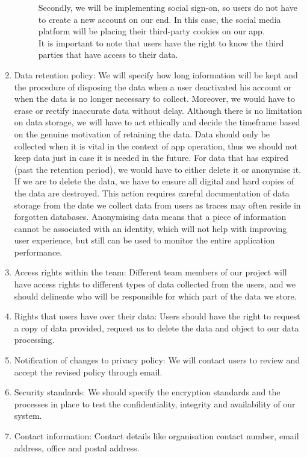 \begin{enumerate}
\begin{description}
        Secondly, we will be implementing social sign-on, so users do not have to create a new account on our end. In this case, the social media 
        platform will be placing their third-party cookies on our app.
        \\It is important to note that users have the right to know the third parties that have access to their data.
    \end{description}
    \item Data retention policy: We will specify how long information will be kept and the procedure of disposing the data when a user deactivated
    his account or when the data is no longer necessary to collect. Moreover, we would have to erase or rectify inaccurate data without delay. Although 
    there is no limitation on data storage, we will have to act ethically and
    decide the timeframe based on the genuine motivation of retaining the data. Data should only be collected when it is vital in the context
    of app operation, thus we should not keep data just in case it is needed in the future. For data that has expired (past the retention period), we 
    would have to either delete it or anonymise it. If we are to delete the data, we have to ensure all digital and hard copies of the data are destroyed. 
    This action requires careful documentation of data storage from the date we collect data from users as traces may often reside in forgotten databases.
    Anonymising data means that a piece of information cannot be associated with an identity, which will not help with improving user experience, but still 
    can be used to monitor the entire application performance.
    \item Access rights within the team: Different team members of our project will have access rights to different types of data collected from
    the users, and we should delineate who will be responsible for which part of the data we store.
    \item Rights that users have over their data: Users should have the right to request a copy of data provided, request us to delete the data and object to our data processing.
    \item Notification of changes to privacy policy: We will contact users to review and accept the revised policy through email.
    \item Security standards: We should specify the encryption standards and the processes in place to test the confidentiality, integrity and availability of 
    our system.
    \item Contact information: Contact details like organisation contact number, email address, office and postal address.
\end{enumerate}

